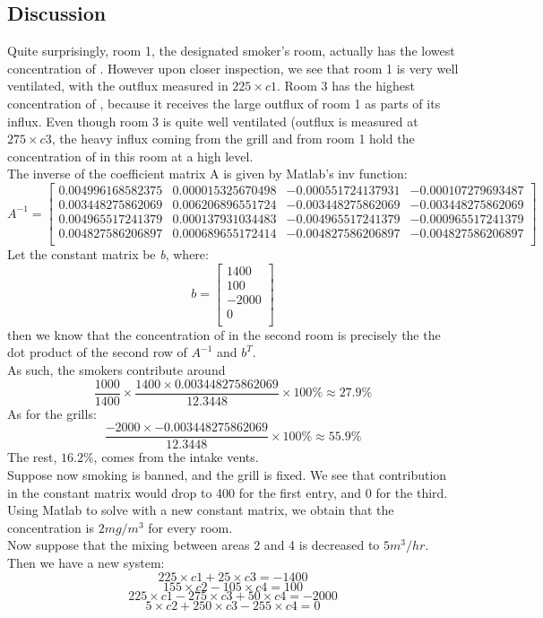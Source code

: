 \documentclass[openany]{book}
\begin{document}
    \subsection{Discussion}
    
    Quite surprisingly, room 1, the designated smoker's room, actually has the lowest concentration of . However upon closer inspection, we see that room 1 is very well ventilated, with the outflux measured in ${225 \times c1}$. Room 3 has the highest concentration of , because it receives the large outflux of room 1 as parts of its influx. Even though room 3 is quite well ventilated (outflux is measured at ${275 \times c3}$, the heavy influx coming from the grill and from room 1 hold the concentration of  in this room at a high level.\\
    
    The inverse of the coefficient matrix A is given by Matlab's inv function:
     \[
   		A^{-1}=
  		\left[ {\begin{array}{cccc}
   		0.004996168582375 &  0.000015325670498 & -0.000551724137931 & -0.000107279693487\\
   		0.003448275862069 & 0.006206896551724 & -0.003448275862069 & -0.003448275862069\\
   		0.004965517241379 & 0.000137931034483 & -0.004965517241379 & -0.000965517241379\\
   		0.004827586206897 & 0.000689655172414  & -0.004827586206897 & -0.004827586206897\\
  		\end{array} } \right]
	\]
	Let the constant matrix be \emph{b}, where:
	\[
   		b=
  		\left[ {\begin{array}{c}
   		1400\\
   		100\\
   		-2000\\
   		0\\
  		\end{array} } \right]
	\]
	then we know that the concentration of  in the second room is precisely the the dot product of the second row of ${A^{-1}}$ and ${b^{T}}$.\\
	As such, the smokers contribute around
	\[\frac{1000}{1400} \times \frac{1400 \times 0.003448275862069}{12.3448} \times 100\% \approx 27.9\%\]
	As for the grills:
	\[\frac{-2000 \times -0.003448275862069}{12.3448} \times 100\% \approx 55.9\%\]
	The rest, ${16.2\%}$, comes from the intake vents.
    \\
    Suppose now smoking is banned, and the grill is fixed. We see that  contribution in the constant matrix would drop to 400 for the first entry, and 0 for the third. Using Matlab to solve with a new constant matrix, we obtain that the concentration is ${2 mg/m^3}$ for every room.
    \\
    Now suppose that the mixing between areas 2 and 4 is decreased to ${5m^3/hr}$. Then we have a new system:
    \[225{\times}c1 + 25{\times}c3 = -1400\]
	\[155{\times}c2 - 105{\times}c4 = 100\]
	\[225{\times}c1 - 275{\times}c3 + 50{\times}c4 = -2000\]
	\[5{\times}c2 + 250{\times}c3 - 255{\times}c4 = 0\]
	
\end{document}
